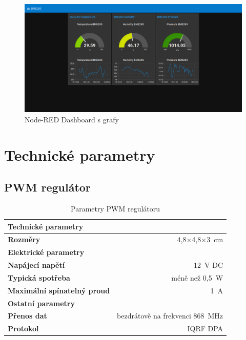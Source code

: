 \documentclass[12pt,a4paper]{article}
\begin{document}
\begin{figure}[H]
\centering
\label{fig:node-red_dashboard}
\includegraphics[width = 150mm]{../img/node-red_dashboard.png}
\caption{Node-RED Dashboard s grafy}
\end{figure}

\newpage

\section{Technické parametry}

\subsection{PWM regulátor}

\begin{table}[H]
  \centering
  \begin{tabular}{lr}
    \hline
    \textbf{Technické parametry} & ~ \\
    \hline
    \hline
    \textbf{Rozměry} & 4,8$\times$4,8$\times$3~cm \\
    \hline
    \textbf{Elektrické parametry} \\
    \hline
    \hline
    \textbf{Napájecí napětí} & 12~V DC\index[zkr]{DC!Direct current|textit} \\
    \textbf{Typická spotřeba} & méně než 0,5~W \\
    \textbf{Maximální spínatelný proud} & 1~A \\
    \hline
    \textbf{Ostatní parametry} \\
    \hline
    \hline
    \textbf{Přenos dat} & bezdrátově na frekvenci 868~MHz \\
    \textbf{Protokol} & IQRF DPA \\
  \end{tabular}
  \caption{Parametry PWM regulátoru}\label{table:parametry/fan-regulator}
\end{table}
\end{document}
